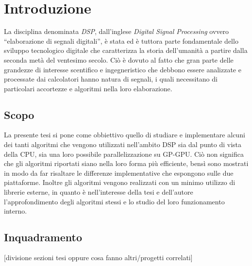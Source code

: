 \chapter{Introduzione}
La disciplina denominata \textit{DSP}, dall'inglese \textit{Digital Signal Processing} ovvero ``elaborazione di segnali digitali'', è stata ed è tuttora parte fondamentale dello sviluppo tecnologico digitale che caratterizza la storia dell'umanità a partire dalla seconda metà del ventesimo secolo. Ciò è dovuto al fatto che gran parte delle grandezze di interesse scentifico e ingegneristico che debbono essere analizzate e processate dai calcolatori hanno natura di segnali, i quali necessitano di particolari accortezze e algoritmi nella loro elaborazione.

\section{Scopo}
La presente tesi si pone come obbiettivo quello di studiare e implementare alcuni dei tanti algoritmi che vengono utilizzati nell'ambito DSP sia dal punto di vista della CPU, sia una loro possibile parallelizzazione su GP-GPU. Ciò non significa che gli algoritmi riportati siano nella loro forma più efficiente, bensì sono mostrati in modo da far risaltare le differenze implementative che espongono sulle due piattaforme. Inoltre gli algoritmi vengono realizzati con un minimo utilizzo di librerie esterne, in quanto è nell'interesse della tesi e dell'autore l'approfondimento degli algoritmi stessi e lo studio del loro funzionamento interno.



\section{Inquadramento}
[divisione sezioni tesi oppure cosa fanno altri/progetti correlati]